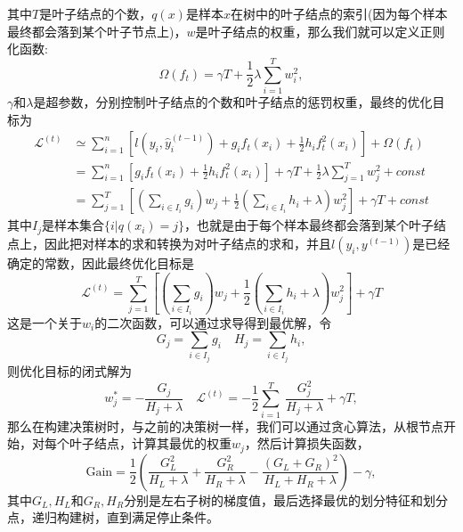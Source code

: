 其中$T$是叶子结点的个数，$q(x)$是样本$x$在树中的叶子结点的索引(因为每个样本最终都会落到某个叶子节点上)，$w$是叶子结点的权重，那么我们就可以定义正则化函数:
\begin{equation}
	\Omega(f_t)=\gamma T+\frac{1}{2}\lambda\sum_{i=1}^{T}w_i^2,
\end{equation}
$\gamma$和$\lambda$是超参数，分别控制叶子结点的个数和叶子结点的惩罚权重，最终的优化目标为
\begin{equation}
	\begin{aligned}
		\mathcal{L}^{(t)} & \simeq\sum_{i=1}^{n}\left[l\left(y_{i},\hat{y}_{i}^{(t-1)}\right)+g_{i}f_{t}(x_{i})+\frac{1}{2}h_{i}f_{t}^{2}(x_{i})\right]+\Omega(f_{t})
		\\
		                  & =\sum_{i=1}^{n}\left[g_{i}f_{t}(x_{i})+\frac{1}{2}h_{i}f_{t}^{2}(x_{i})\right]+\gamma T+\frac{1}{2}\lambda\sum_{j=1}^{T}w_{j}^{2}+const
		\\
		                  & =\sum_{j=1}^{T}\left[(\sum_{i\in I_{i}}g_{i})w_{j}+\frac{1}{2}(\sum_{i\in I_{i}}h_{i}+\lambda)w_{j}^{2}\right]+\gamma T+const
	\end{aligned}
\end{equation}
其中$I_j$是样本集合$\{i|q(x_i)=j\}$，也就是由于每个样本最终都会落到某个叶子结点上，因此把对样本的求和转换为对叶子结点的求和，并且$l(y_i,y^{(t-1)})$是已经确定的常数，因此最终优化目标是
\begin{equation}
	\mathcal{L}^{(t)}=\sum_{j=1}^{T}\left[(\sum_{i\in I_{i}}g_{i})w_{j}+\frac{1}{2}(\sum_{i\in I_{i}}h_{i}+\lambda)w_{j}^{2}\right]+\gamma T
\end{equation}
这是一个关于$w_i$的二次函数，可以通过求导得到最优解，令
\begin{equation}
	G_j=\sum_{i \in I_j}g_i\quad H_j=\sum_{i \in I_j}h_i,
\end{equation}
则优化目标的闭式解为
\begin{equation}
	w_{j}^{*}=-\frac{G_{j}}{H_{j}+\lambda}\quad \mathcal{L}^{(t)}=-\frac{1}{2}\sum_{i=1}^{T}\:\frac{G_{j}^{2}}{H_{j}+\lambda}+\gamma T,
\end{equation}
那么在构建决策树时，与之前的决策树一样，我们可以通过贪心算法，从根节点开始，对每个叶子结点，计算其最优的权重$w_j$，然后计算损失函数，
\begin{equation}
	\text{Gain}=\frac{1}{2}(\frac{G_{L}^{2}}{H_{L}+\lambda}+\frac{G_{R}^{2}}{H_{R}+\lambda}-\frac{(G_{L}+G_{R})^{2}}{H_{L}+H_{R}+\lambda})-\gamma,
\end{equation}
其中$G_L,H_L$和$G_R,H_R$分别是左右子树的梯度值，最后选择最优的划分特征和划分点，递归构建树，直到满足停止条件。
